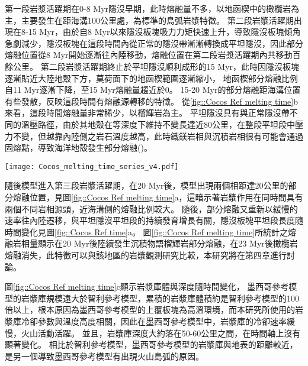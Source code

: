 第一段岩漿活躍期在0-8 Myr隱沒早期，此時熔融量不多，以地函楔中的橄欖岩為主，主要發生在距海溝100公里處，為標準的島弧岩漿特徵。
第二段岩漿活躍期出現在8-15 Myr，由於自8 Myr以來隱沒板塊吸力力矩快速上升，導致隱沒板塊傾角急劇減少，隱沒板塊在這段時間內從正常的隱沒帶漸漸轉換成平坦隱沒，因此部分熔融位置從8 Myr開始逐漸往內陸移動，熔融位置在第二段岩漿活躍期內共移動百餘公里。
第二段岩漿活躍期終止於平坦隱沒順利成形的15 Myr，此時因隱沒板塊逐漸貼近大陸地殼下方，莫荷面下的地函楔範圍逐漸縮小，
地函楔部分熔融比例自11 Myr逐漸下降，至15 Myr熔融量趨近於0。
15-20 Myr的部分熔融距海溝位置有些發散，反映這段時間有熔融源轉移的特徵。
從\ref{fig::Cocos Ref melting time}b來看，這段時間熔融量非常稀少，以榴輝岩為主。
平坦隱沒具有與正常隱沒帶不同的溫壓路徑，由於其地殼在等深度下維持不變長達近80公里，在整段平坦段中壓力不變，但越靠內陸側之岩石溫度越高，此時鐵鎂岩相與沉積岩相很有可能會通過固熔點，導致海洋地殼發生部分熔融(\citealp{Gutscher2000Bcan})。

\begin{figure*}[ht!]
    \centering
    \texttt{[image: Cocos\_melting\_time\_series\_v4.pdf]}
    \caption[墨西哥參考模型岩漿作用隨時間變化]{墨西哥參考模型岩漿作用隨時間變化，灰色底標出平坦隱沒發育後時間段。(a)部分熔融與海溝之距離隨時間變化圖，縱軸中每個點代表每次部分熔融發生位置，顏色為指數上的部分熔融比例。(b)岩石熔融量隨時間變化圖，熔融量單位為每單位海溝產生之立方公里量中每20萬年瞬時量。顏色代表不同岩相。(c)岩漿庫體積與深度隨時間變化圖，岩漿庫單位為每單位海溝之立方公里量。顏色代表該時間中岩漿庫的平均所在深度。}
    \label{fig::Cocos Ref melting time}
\end{figure*}

隨後模型進入第三段岩漿活躍期，在20 Myr後，模型出現兩個相距達20公里的部分熔融位置，見圖\ref{fig::Cocos Ref melting time}a，這暗示著岩漿作用在同時間具有兩個不同岩相源頭，近海溝側的熔融比例較大。
隨後，部分熔融又重新以緩慢的速率往內陸遷移，與平坦隱沒平坦段的持續發育增長有關，隱沒板塊平坦段長度隨時間變化見圖\ref{fig::Cocos Ref time}a。
圖\ref{fig::Cocos Ref melting time}所統計之熔融岩相量顯示在20 Myr後陸續發生沉積物語榴輝岩部分熔融，在23 Myr後橄欖岩熔融消失，此特徵可以與該地區的岩漿觀測研究比較，本研究將在第四章進行討論。

圖\ref{fig::Cocos Ref melting time}c顯示岩漿庫體與深度隨時間變化，
墨西哥參考模型的岩漿庫規模遠大於智利參考模型，累積的岩漿庫體積約是智利參考模型的100倍以上，根本原因為墨西哥參考模型的上覆板塊為高溫環境，而本研究所使用的岩漿庫冷卻參數與溫度高度相關，因此在墨西哥參考模型中，岩漿庫的冷卻速率緩慢，火山活動活躍。
並且，岩漿庫深度大約落在50-60公里之間，在時間軸上沒有顯著變化。
相比於智利參考模型，墨西哥參考模型的岩漿庫與地表的距離較近，是另一個導致墨西哥參考模型有出現火山島弧的原因。

